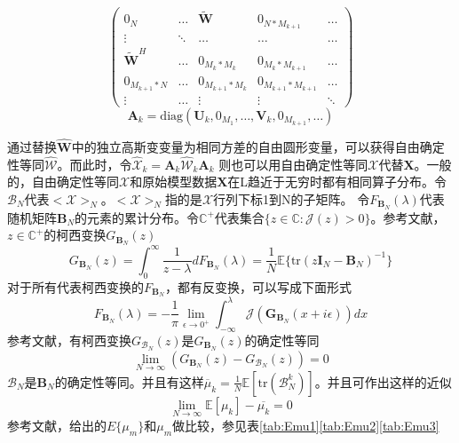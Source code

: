 \documentclass[bachelor,nocolorlinks, printoneside]{seuthesis} %
\begin{document}
\begin{Main}
\begin{equation}
\left(
\begin{array}{ccccc}
0_N & \ldots & \tilde{\mathbf{W}} & 0_{N*M_{k+1}} & \ldots \\
\vdots & \ddots & \ldots & \ldots & \ldots \\
\tilde{\mathbf{W}}^H & \ldots & 0_{M_k * M_k} & 0_{M_k*M_{k+1}} & \ldots \\
0_{M_{k+1}*N} & \ldots & 0_{M_{k+1} *M_k} & 0_{M_{k+1}*M_{k+1}} & \ldots \\
\vdots & \ldots & \vdots & \vdots & \ddots
\end{array}
\right)
\end{equation}
\begin{equation}\label{key}
\mathbf{A}_k = \mathrm{diag}(\mathbf{U}_k,0_{M_1},\ldots,\mathbf{V}_k,0_{M_{k+1}},\ldots)
\end{equation}

通过替换$\hat{\mathbf{W}}$中的独立高斯变变量为相同方差的自由圆形变量，可以获得自由确定性等同$\hat{\mathcal{W}}$。而此时，令$\hat{\mathcal{X}}_k = \mathbf{A}_k \hat{\mathcal{W}}_k \mathbf{A}_k$ 则也可以用自由确定性等同$\mathcal{X}$代替$\mathbf{X}$。一般的，自由确定性等同$\mathcal{X}$和原始模型数据$\mathbf{X}$在L趋近于无穷时都有相同算子分布。令$\mathcal{B}_N$代表$<\mathcal{X}>_N$。$<\mathcal{X}>_N$指的是$\mathcal{X}$行列下标1到N的子矩阵。
令$F_{\mathbf{B}_N}(\lambda)$代表随机矩阵$\mathbf{B}_N$的元素的累计分布。令$\mathbb{C}^+$代表集合$\lbrace z\in \mathbb{C}: \mathcal{J}(z) > 0 \rbrace$。参考文献，$z \in \mathbb{C}^+$的柯西变换$G_{\mathbf{B}_N}(z)$
\begin{equation}\label{key}
G_{\mathbf{B}_N}(z) = \int_0^\infty \frac{1}{z-\lambda} dF_{\mathbf{B}_N}(\lambda) = \frac{1}{N} \mathbb{E}\lbrace \mathrm{tr}(z \mathbf{I}_N - \mathbf{B}_N)^{-1}\rbrace
\end{equation}
对于所有代表柯西变换的$F_{\mathbf{B}_N}$，都有反变换，可以写成下面形式
\begin{equation}\label{key}
F_{\mathbf{B}_N}(\lambda) = -\frac{1}{\pi} \lim_{\epsilon \rightarrow 0^+} \int_{-\infty}^{\lambda}  \mathcal{J}(\mathbf{G}_{\mathbf{B}_N}(x+i\epsilon))dx
\end{equation}
参考文献，有柯西变换$G_{\mathcal{B}_N}(z)$是$G_{\mathbf{B}_N}(z)$的确定性等同
\begin{equation}\label{key}
\lim_{N \rightarrow \infty}(G_{\mathbf{B}_N}(z)-G_{\mathcal{B}_N}(z)) = 0
\end{equation}
$\mathcal{B}_N$是$\mathbf{B}_N$的确定性等同。并且有这样$\overline{\mu}_k = \frac{1}{N}\mathbb{E}[\mathrm{tr}(\mathcal{B}_N^k)]$。并且可作出这样的近似
\begin{equation}\label{key}
\lim_{N \rightarrow \infty} \mathbb{E}[\mu_k] -\overline{\mu_k} =0
\end{equation}
参考文献\cite{lu2015low}，给出的$E\lbrace\mu_m\rbrace$和$\mu_m$做比较，参见表\ref{tab:Emu1}\ref{tab:Emu2}\ref{tab:Emu3}


\end{Main}
\end{document}
